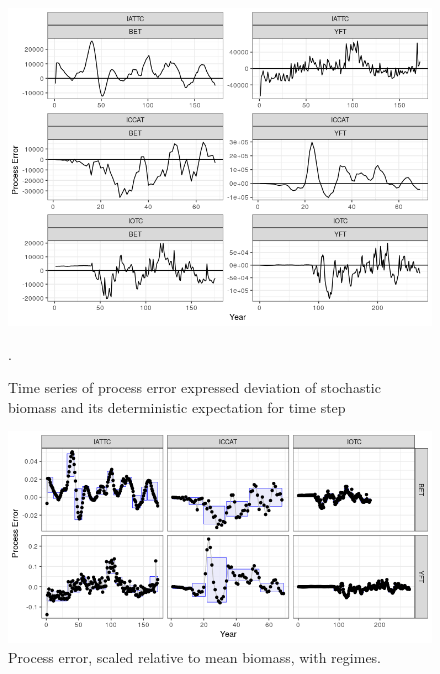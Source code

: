 \documentclass[12pt,doublespacing,a4paper]{ouparticle}
\begin{document}
\newpage
\begin{figure}[h]
\centering
\includegraphics[width=\textwidth]{pe-pe-1.png}
\caption{Time series of process error expressed deviation of stochastic biomass and its deterministic expectation for time step}.
\label{fig:pe}
\end{figure}


\newpage
\begin{figure}[h]
\centering
\includegraphics[width=\textwidth]{pe-pe2-1.png}
\caption{Process error, scaled relative to mean biomass, with regimes.}
\label{fig:pe2}
\end{figure}
\end{document}
